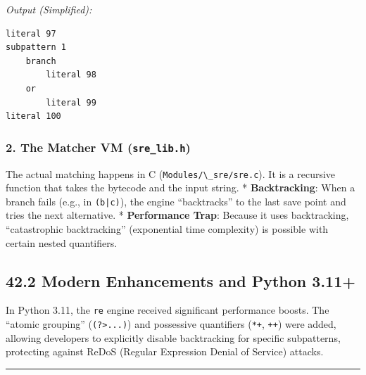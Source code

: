 \emph{Output (Simplified):}

\begin{lstlisting}
literal 97
subpattern 1
    branch
        literal 98
    or
        literal 99
literal 100
\end{lstlisting}

\hypertarget{the-matcher-vm-sre_lib.h}{%
\subsubsection{\texorpdfstring{2. The Matcher VM
(\texttt{sre\_lib.h})}{2. The Matcher VM (sre\_lib.h)}}\label{the-matcher-vm-sre_lib.h}}

The actual matching happens in C
(\passthrough{\lstinline!Modules/\_sre/sre.c!}). It is a recursive
function that takes the bytecode and the input string. *
\textbf{Backtracking}: When a branch fails (e.g., in
\passthrough{\lstinline!(b|c)!}), the engine ``backtracks'' to the last
save point and tries the next alternative. * \textbf{Performance Trap}:
Because it uses backtracking, ``catastrophic backtracking'' (exponential
time complexity) is possible with certain nested quantifiers.

\hypertarget{modern-enhancements-and-python-3.11}{%
\subsection{42.2 Modern Enhancements and Python
3.11+}\label{modern-enhancements-and-python-3.11}}

In Python 3.11, the \passthrough{\lstinline!re!} engine received
significant performance boosts. The ``atomic grouping''
(\passthrough{\lstinline!(?>...)!}) and possessive quantifiers
(\passthrough{\lstinline!*+!}, \passthrough{\lstinline!++!}) were added,
allowing developers to explicitly disable backtracking for specific
subpatterns, protecting against ReDoS (Regular Expression Denial of
Service) attacks.

\begin{center}\rule{0.5\linewidth}{0.5pt}\end{center}
